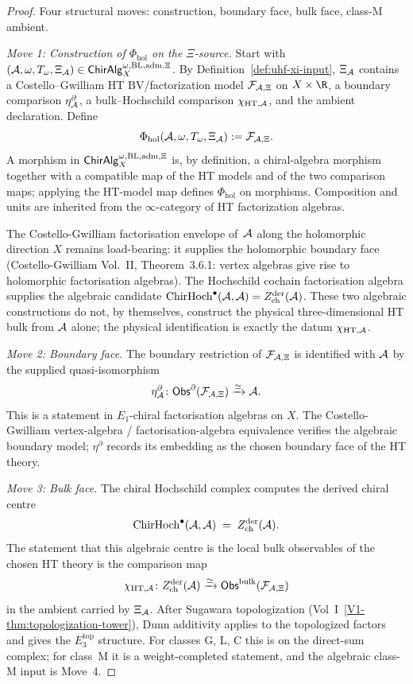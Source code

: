 \begin{proof}
Four structural moves: construction, boundary face, bulk face,
class-M ambient.

\emph{Move 1: Construction of $\Phi_{\mathrm{hol}}$ on the
\(\Xi\)-source.}
Start with
\((\mathcal{A},\omega,T_\omega,\Xi_{\mathcal{A}})\in
\mathsf{ChirAlg}^{\omega,\mathrm{BL,adm},\Xi}_X\). By
Definition~\ref{def:uhf-xi-input}, \(\Xi_{\mathcal{A}}\) contains a
Costello--Gwilliam HT BV/factorization model
\(\mathcal{F}_{\mathcal{A},\Xi}\) on \(X\times\R\), a boundary comparison
\(\eta^\partial_{\mathcal{A}}\), a bulk--Hochschild comparison
\(\chi_{\mathrm{HT},\mathcal{A}}\), and the ambient declaration. Define
\[
 \Phi_{\mathrm{hol}}(\mathcal{A},\omega,T_\omega,\Xi_{\mathcal{A}})
 := \mathcal{F}_{\mathcal{A},\Xi}.
\]
A morphism in
\(\mathsf{ChirAlg}^{\omega,\mathrm{BL,adm},\Xi}_X\) is, by definition, a
chiral-algebra morphism together with a compatible map of the HT
models and of the two comparison maps; applying the HT-model map
defines \(\Phi_{\mathrm{hol}}\) on morphisms. Composition and units are
inherited from the \(\infty\)-category of HT factorization algebras.

The Costello-Gwilliam factorisation envelope of~\(\mathcal{A}\) along the
holomorphic direction \(X\) remains load-bearing: it supplies the
holomorphic boundary face (Costello-Gwilliam Vol.~II, Theorem~3.6.1:
vertex algebras give rise to holomorphic factorisation algebras).
The Hochschild cochain factorisation algebra supplies the algebraic
candidate
\(\mathrm{ChirHoch}^\bullet(\mathcal{A},\mathcal{A})=Z^{\mathrm{der}}_{\mathrm{ch}}(\mathcal{A})\). These two algebraic
constructions do not, by themselves, construct the physical
three-dimensional HT bulk from \(\mathcal{A}\) alone; the physical
identification is exactly the datum
\(\chi_{\mathrm{HT},\mathcal{A}}\).

\emph{Move 2: Boundary face.}
The boundary restriction of \(\mathcal{F}_{\mathcal{A},\Xi}\) is identified with
\(\mathcal{A}\) by the supplied quasi-isomorphism
\[
 \eta^\partial_{\mathcal{A}}\colon
 \mathsf{Obs}^\partial(\mathcal{F}_{\mathcal{A},\Xi})\xrightarrow{\simeq}\mathcal{A} .
\]
This is a statement in \(E_1\)-chiral factorisation algebras on \(X\).
The Costello-Gwilliam vertex-algebra / factorisation-algebra
equivalence verifies the algebraic boundary model; \(\eta^\partial\)
records its embedding as the chosen boundary face of the HT theory.

\emph{Move 3: Bulk face.}
The chiral Hochschild complex computes the derived chiral centre
\[
 \mathrm{ChirHoch}^\bullet(\mathcal{A}, \mathcal{A})
 \;=\;
 Z^{\mathrm{der}}_{\mathrm{ch}}(\mathcal{A}).
\]
The statement that this algebraic centre is the local bulk observables
of the chosen HT theory is the comparison map
\[
 \chi_{\mathrm{HT},\mathcal{A}}\colon
 Z^{\mathrm{der}}_{\mathrm{ch}}(\mathcal{A})\xrightarrow{\simeq}
 \mathsf{Obs}^{\mathrm{bulk}}(\mathcal{F}_{\mathcal{A},\Xi})
\]
in the ambient carried by \(\Xi_{\mathcal{A}}\). After Sugawara
topologization (Vol~I~\ref*{V1-thm:topologization-tower}), Dunn
additivity applies to the topologized factors and gives the
$E_3^{\mathrm{top}}$ structure. For classes G, L, C this is on the
direct-sum complex; for class~M it is a weight-completed statement,
and the algebraic class-M input is Move~4.


\end{proof}
